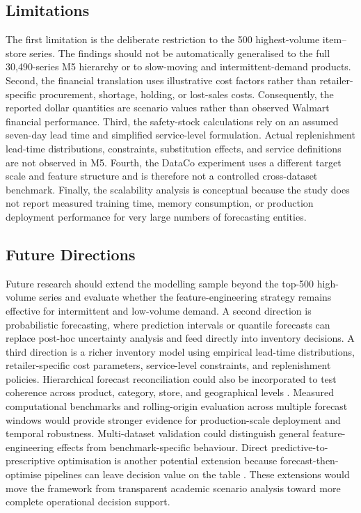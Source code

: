 \subsection{Limitations}

The first limitation is the deliberate restriction to the 500 highest-volume item--store series.
The findings should not be automatically generalised to the full 30,490-series M5 hierarchy or to slow-moving and intermittent-demand products.
Second, the financial translation uses illustrative cost factors rather than retailer-specific procurement, shortage, holding, or lost-sales costs.
Consequently, the reported dollar quantities are scenario values rather than observed Walmart financial performance.
Third, the safety-stock calculations rely on an assumed seven-day lead time and simplified service-level formulation.
Actual replenishment lead-time distributions, constraints, substitution effects, and service definitions are not observed in M5.
Fourth, the DataCo experiment uses a different target scale and feature structure and is therefore not a controlled cross-dataset benchmark.
Finally, the scalability analysis is conceptual because the study does not report measured training time, memory consumption, or production deployment performance for very large numbers of forecasting entities.

\subsection{Future Directions}

Future research should extend the modelling sample beyond the top-500 high-volume series and evaluate whether the feature-engineering strategy remains effective for intermittent and low-volume demand.
A second direction is probabilistic forecasting, where prediction intervals or quantile forecasts can replace post-hoc uncertainty analysis and feed directly into inventory decisions.
A third direction is a richer inventory model using empirical lead-time distributions, retailer-specific cost parameters, service-level constraints, and replenishment policies.
Hierarchical forecast reconciliation could also be incorporated to test coherence across product, category, store, and geographical levels \cite{RIFT2026SupplyChain,Bergsma2025InventoryML}.
Measured computational benchmarks and rolling-origin evaluation across multiple forecast windows would provide stronger evidence for production-scale deployment and temporal robustness.
Multi-dataset validation could distinguish general feature-engineering effects from benchmark-specific behaviour.
Direct predictive-to-prescriptive optimisation is another potential extension because forecast-then-optimise pipelines can leave decision value on the table \cite{Bergsma2025InventoryML}.
These extensions would move the framework from transparent academic scenario analysis toward more complete operational decision support.

